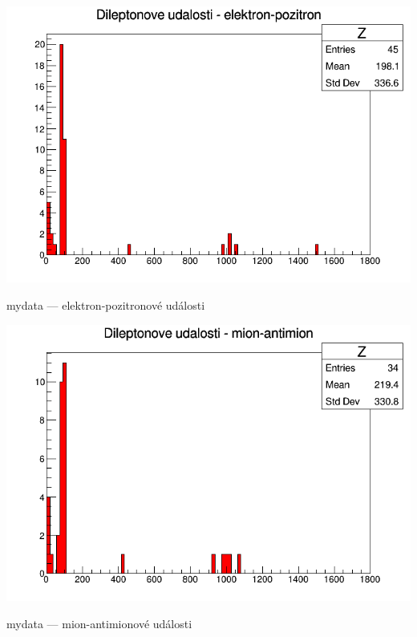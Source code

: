 \begin{graph}[htbp]
\centering
\includegraphics[width=\textwidth-2cm]{graficos/mydataz/c1_n10.png}
\caption{mydata --- elektron-pozitronové události}
\label{o:m2}
\end{graph}

\begin{graph}[htbp]
\centering
\includegraphics[width=\textwidth-2cm]{graficos/mydataz/c1_n11.png}
\caption{mydata --- mion-antimionové události}
\label{o:m3}
\end{graph}

